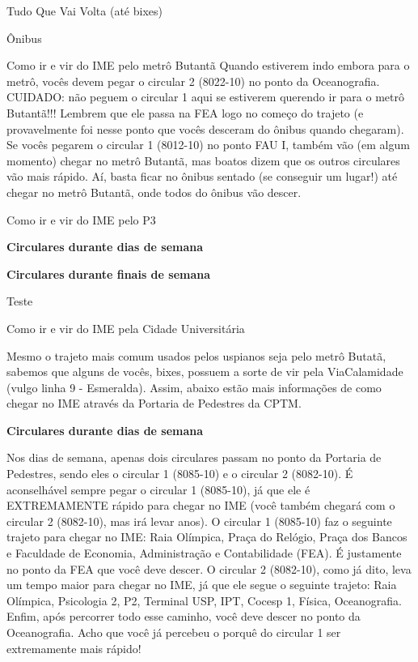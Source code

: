 \begin{secao}{Tudo Que Vai Volta (até bixes)}
\begin{subsecao}{Ônibus}
\begin{subsubsecao}{Como ir e vir do IME pelo metrô Butantã}
Quando estiverem indo embora para o metrô, vocês devem pegar o circular 2
(8022-10) no ponto da Oceanografia. CUIDADO: não peguem o circular 1 aqui
se estiverem querendo ir para o metrô Butantã!!! Lembrem que ele passa na
FEA logo no começo do trajeto (e provavelmente foi nesse ponto que vocês
desceram do ônibus quando chegaram). Se vocês pegarem o circular 1 (8012-10)
no ponto FAU I, também vão (em algum momento) chegar no metrô Butantã, mas
boatos dizem que os outros circulares vão mais rápido. Aí, basta ficar no
ônibus sentado (se conseguir um lugar!) até chegar no metrô Butantã, onde 
todos do ônibus vão descer.

\end{subsubsecao}

\begin{subsubsecao}{Como ir e vir do IME pelo P3}

{\bf Circulares durante dias de semana}

{\bf Circulares durante finais de semana}

Teste

\end{subsubsecao}

\begin{subsubsecao}{Como ir e vir do IME pela Cidade Universitária}

Mesmo o trajeto mais comum usados pelos uspianos seja pelo metrô Butatã, sabemos 
que alguns de vocês, bixes, possuem a sorte de vir pela ViaCalamidade 
(vulgo linha 9 - Esmeralda). 
Assim, abaixo estão mais informações de como chegar no IME através da Portaria de 
Pedestres da CPTM.

{\bf Circulares durante dias de semana}

Nos dias de semana, apenas dois circulares passam no ponto da Portaria de Pedestres,
sendo eles o circular 1 (8085-10) e o circular 2 (8082-10). É aconselhável sempre 
pegar o circular 1 (8085-10), já que ele é EXTREMAMENTE rápido para chegar no IME 
(você também chegará com o circular 2 (8082-10), mas irá levar anos).
O circular 1 (8085-10) faz o seguinte trajeto para chegar no IME: Raia Olímpica, 
Praça do Relógio, Praça dos Bancos e Faculdade de Economia, Administração e Contabilidade
(FEA). É justamente no ponto da FEA que você deve descer.
O circular 2 (8082-10), como já dito, leva um tempo maior para chegar no IME, já
que ele segue o seguinte trajeto: Raia Olímpica, Psicologia 2, P2, Terminal USP, IPT,
Cocesp 1, Física, Oceanografia. Enfim, após percorrer todo esse caminho, você deve 
descer no ponto da Oceanografia. Acho que você já percebeu o porquê do circular 1
ser extremamente mais rápido!


\end{subsubsecao}
\end{subsecao}
\end{secao}
